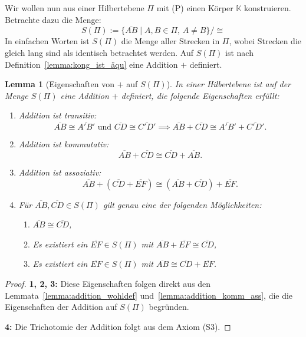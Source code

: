 \documentclass[a4paper,12pt]{article}
\theoremstyle{break}
\newtheorem{lemma}[definition]{Lemma}
\begin{document}
\medskip

Wir wollen nun aus einer Hilbertebene \(\Pi\) mit (P) einen Körper \(\mathbb{K}\) konstruieren. Betrachte dazu die Menge:
\[
S(\Pi) := \{\overline{AB} \mid A, B \in \Pi, \, A \neq B\} / \cong
\]
In einfachen Worten ist $S(\Pi)$ die Menge aller Strecken in $\Pi$, wobei Strecken die gleich lang sind als identisch betrachtet werden.
Auf \(S(\Pi)\) ist nach Definition~\ref{lemma:kong_ist_äqu} eine Addition \(+\) definiert.

\begin{lemma}[Eigenschaften von \(+\) auf \(S(\Pi)\)]
In einer Hilbertebene ist auf der Menge \(S(\Pi)\) eine Addition \(+\) definiert, die folgende Eigenschaften erfüllt:
\begin{enumerate}
    \item Addition ist transitiv:
    \[
    \overline{AB} \cong \overline{A'B'} \text{ und } \overline{CD} \cong \overline{C'D'} \implies \overline{AB} + \overline{CD} \cong \overline{A'B'} + \overline{C'D'}.
    \]
    \item Addition ist kommutativ:
    \[
    \overline{AB} + \overline{CD} \cong \overline{CD} + \overline{AB}.
    \]
    \item Addition ist assoziativ:
    \[
    \overline{AB} + (\overline{CD} + \overline{EF}) \cong (\overline{AB} + \overline{CD}) + \overline{EF}.
    \]
    \item Für \(\overline{AB}, \overline{CD} \in S(\Pi)\) gilt genau eine der folgenden Möglichkeiten:
    \begin{enumerate}
        \item \(\overline{AB} \cong \overline{CD}\),
        \item Es existiert ein \(\overline{EF} \in S(\Pi)\) mit \(\overline{AB} + \overline{EF} \cong \overline{CD}\),
        \item Es existiert ein \(\overline{EF} \in S(\Pi)\) mit \(\overline{AB} \cong \overline{CD} + \overline{EF}\).
    \end{enumerate}
\end{enumerate}
\end{lemma}

\begin{proof}
\textbf{1, 2, 3:} Diese Eigenschaften folgen direkt aus den Lemmata~\ref{lemma:addition_wohldef} und~\ref{lemma:addition_komm_ass}, die die Eigenschaften der Addition auf \(S(\Pi)\) begründen.  

\textbf{4:} Die Trichotomie der Addition folgt aus dem Axiom (S3).
\end{proof}
\end{document}
